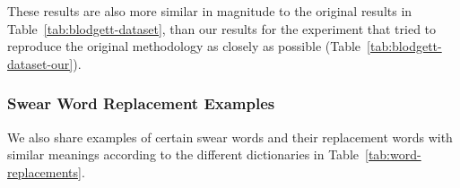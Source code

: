 These results are also more similar in magnitude to the original results in Table~\ref{tab:blodgett-dataset}, than our results for the experiment that tried to reproduce the original methodology as closely as possible (Table~\ref{tab:blodgett-dataset-our}).

\subsubsection{Swear Word Replacement Examples}

We also share examples of certain swear words and their replacement words with similar meanings according to the different dictionaries in Table~\ref{tab:word-replacements}.

\begin{table}[]
\centering
\caption{Comparison of replacement words as generated by the different dictionaries}
\label{tab:word-replacements}
\end{table}



